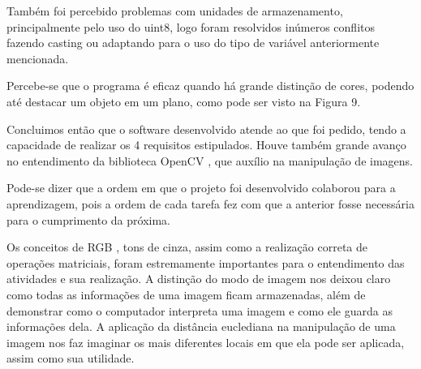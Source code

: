 \documentclass{bmvc2k}
\begin{document}
Também foi percebido problemas com unidades de armazenamento, principalmente
pelo uso do uint8, logo foram resolvidos inúmeros conflitos fazendo casting
ou adaptando para o uso do tipo de variável anteriormente mencionada.

Percebe-se que o programa é eficaz quando há grande distinção de cores, podendo até 
destacar um objeto em um plano, como pode ser visto na {Figura 9}.

Concluimos então que o software desenvolvido atende ao que foi pedido, tendo a capacidade
de realizar os 4 requisitos estipulados. Houve também grande avanço no entendimento da 
biblioteca OpenCV \cite{OpenCV}, que auxílio na manipulação de imagens.

Pode-se dizer que a ordem em que o projeto foi desenvolvido colaborou para a aprendizagem, pois 
a ordem de cada tarefa fez com que a anterior fosse necessária para o cumprimento da 
próxima.

Os conceitos de RGB \cite{geraldbakker} \cite{blind}, tons de cinza, assim como a realização correta de operações matriciais, foram estremamente importantes
para o entendimento das atividades e sua realização. A distinção do modo de imagem
nos deixou claro como todas as informações de uma imagem ficam armazenadas, além de
demonstrar como o computador interpreta uma imagem e como ele guarda as informações dela. A aplicação da distância euclediana 
na manipulação de uma imagem nos faz imaginar os mais diferentes locais 
em que ela pode ser aplicada, assim como sua utilidade. 


\end{document}
